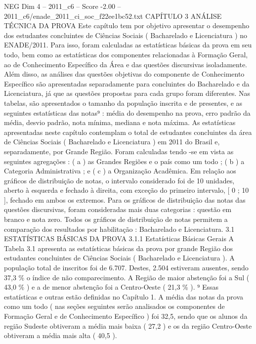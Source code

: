\begin{textsample}{NEG Dim 4 – 2011\_c6 – Score -2.00 – 2011\_c6/enade\_2011\_ci\_soc\_f22ee1bc52.txt}  \label{ex:f4_neg_054}
CAPÍTULO 3 ANÁLISE TÉCNICA DA PROVA Este capítulo tem por objetivo apresentar o desempenho dos estudantes concluintes de Ciências Sociais ( Bacharelado e Licenciatura ) no ENADE/2011.
Para isso, foram calculadas as estatísticas básicas da prova em seu todo, bem como as estatísticas dos componentes relacionadas à Formação Geral, ao de Conhecimento Específico da Área e das questões discursivas isoladamente.
Além disso, as análises das questões objetivas do componente de Conhecimento Específico são apresentadas separadamente para concluintes do Bacharelado e da Licenciatura, já que as questões propostas para cada grupo foram diferentes.
Nas tabelas, são apresentados o tamanho da população inscrita e de presentes, e as seguintes estatísticas das notas⁹ : média do desempenho na prova, erro padrão da média, desvio padrão, nota mínima, mediana e nota máxima.
As estatísticas apresentadas neste capítulo contemplam o total de estudantes concluintes da área de Ciências Sociais ( Bacharelado e Licenciatura ) em 2011 do Brasil e, separadamente, por Grande Região.
Foram calculadas tendo -se em vista as seguintes agregações : ( a ) as Grandes Regiões e o país como um todo ; ( b ) a Categoria Administrativa ; e ( c ) a Organização Acadêmica.
Em relação aos gráficos de distribuição de notas, o intervalo considerado foi de 10 unidades, aberto à esquerda e fechado à direita, com exceção do primeiro intervalo, [ 0 ; 10 ], fechado em ambos os extremos.
Para os gráficos de distribuição das notas das questões discursivas, foram consideradas mais duas categorias : questão em branco e nota zero.
Todos os gráficos de distribuição de notas permitem a comparação dos resultados por habilitação : Bacharelado e Licenciatura. 3.1 ESTATÍSTICAS BÁSICAS DA PROVA 3.1.1 Estatísticas Básicas Gerais A Tabela 3.1 apresenta as estatísticas básicas da prova por grande Região dos estudantes concluintes de Ciências Sociais ( Bacharelado e Licenciatura ).
A população total de inscritos foi de 6.707.
Destes, 2.504 estiveram ausentes, sendo 37,3 \% o índice de não comparecimento.
A Região de maior abstenção foi a Sul ( 43,0 \% ) e a de menor abstenção foi a Centro-Oeste ( 21,3 \% ). ⁹ Essas estatísticas e outras estão definidas no Capítulo 1.
A média das notas da prova como um todo ( nas seções seguintes serão analisados os componentes de Formação Geral e de Conhecimento Específico ) foi 32,5, sendo que os alunos da região Sudeste obtiveram a média mais baixa ( 27,2 ) e os da região Centro-Oeste obtiveram a média mais alta ( 40,5 ).

\end{textsample}
